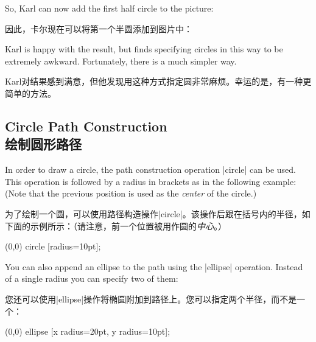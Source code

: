 


So, Karl can now add the first half circle to the picture:

因此，卡尔现在可以将第一个半圆添加到图片中：


%
\begin{codeexample}[]
\end{codeexample}

Karl is happy with the result, but finds specifying circles in this way to be
extremely awkward. Fortunately, there is a much simpler way.

Karl对结果感到满意，但他发现用这种方式指定圆非常麻烦。幸运的是，有一种更简单的方法。


\subsection{Circle Path Construction\\绘制圆形路径}

In order to draw a circle, the path construction operation |circle| can be
used. This operation is followed by a radius in brackets as in the following
example: (Note that the previous position is used as the \emph{center} of the
circle.)
%

为了绘制一个圆，可以使用路径构造操作|circle|。该操作后跟在括号内的半径，如下面的示例所示：（请注意，前一个位置被用作圆的\emph{中心}。）

\begin{codeexample}[]
\tikz \draw (0,0) circle [radius=10pt];
\end{codeexample}

You can also append an ellipse to the path using the |ellipse| operation.
Instead of a single radius you can specify two of them:
%

您还可以使用|ellipse|操作将椭圆附加到路径上。您可以指定两个半径，而不是一个：

\begin{codeexample}[]
\tikz \draw (0,0) ellipse [x radius=20pt, y radius=10pt];
\end{codeexample}

